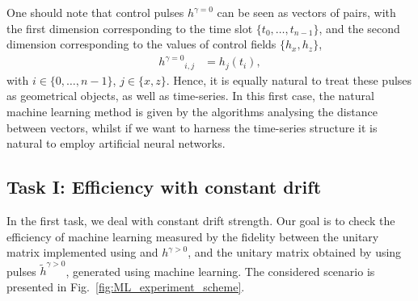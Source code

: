 \documentclass[aps,pra,showkeys,showpacs,notitlepage,superscriptaddress]{revtex4-1}
\newcommand{\1}{{\rm 1\hspace{-0.9mm}l}}
\newcommand{\NCP}{\ensuremath{h^{\gamma=0}}\xspace}
\newcommand{\DCP}{\ensuremath{h^{\gamma >0}}\xspace}
\newcommand{\nnDCP}{\ensuremath{\tilde{h}^{\gamma >0}}\xspace}
\begin{document}
One should note that control pulses $\NCP$ can be seen as vectors of pairs, with
the first dimension corresponding to the time slot $\{t_0, \ldots, t_{n-1}\}$,
and the second dimension corresponding to the values of control fields
$\{h_x,h_z\}$,
\begin{equation}
\begin{split}
\NCP_{i,j} &= h_j(t_i),
\end{split}
\end{equation}
with $i \in \{0,\ldots ,n-1\}$, $j\in\{x,z\}$. Hence, it is equally natural to treat
these pulses as geometrical objects, as well as time-series. In this first case, the
natural machine learning method is given by the algorithms analysing the distance
between vectors, whilst if we want to harness the time-series structure it is natural
to employ artificial neural networks. 


\subsection{Task I: Efficiency with constant drift}

In the first task, we deal with constant drift strength. Our goal is to check 
the efficiency of machine learning measured by the fidelity between the unitary matrix implemented
using and $\DCP$, and the unitary matrix obtained by using pulses $\nnDCP$, generated using machine
learning. The considered scenario is presented in Fig.~\ref{fig:ML_experiment_scheme}.
\end{document}
